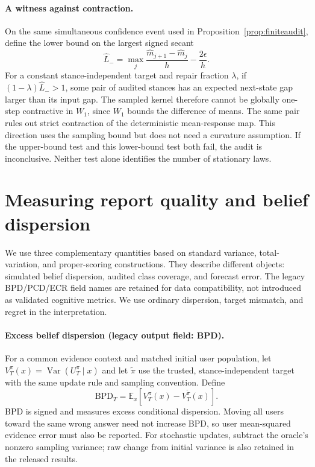 \documentclass[10pt]{article}
\newcommand{\E}{\mathbb E}
\newcommand{\Var}{\operatorname{Var}}
\begin{document}
\paragraph{A witness against contraction.}
On the same simultaneous confidence event used in
Proposition~\ref{prop:finiteaudit}, define the lower bound on the largest
signed secant
\[
 \widehat L_-=\max_j\frac{\widehat m_{j+1}-\widehat m_j}{h}
             -\frac{2\epsilon}{h}.
\]
For a constant stance-independent target and repair fraction $\lambda$,
if $(1-\lambda)\widehat L_->1$, some pair of audited stances has an
expected next-state gap larger than its input gap. The sampled kernel
therefore cannot be globally one-step contractive in $W_1$, since $W_1$
bounds the difference of means. The same pair rules out strict
contraction of the deterministic mean-response map. This direction uses
the sampling bound but does not need a curvature assumption. If the
upper-bound test and this lower-bound test both fail, the audit is
inconclusive. Neither test alone identifies the number of stationary laws.

\section{Measuring report quality and belief dispersion}
We use three complementary quantities based on standard variance,
total-variation, and proper-scoring constructions. They describe different
objects: simulated belief dispersion, audited class coverage, and forecast
error. The legacy BPD/PCD/ECR field names are retained for data compatibility, not introduced as validated cognitive metrics. We use ordinary dispersion, target mismatch, and regret in the interpretation.

\paragraph{Excess belief dispersion (legacy output field: BPD).}
For a common evidence context and matched initial user population, let
$V_T^\pi(x)=\Var(U_T^\pi\mid x)$ and let $\widetilde\pi$ use the trusted,
stance-independent target with the same update rule and sampling convention.
Define
\begin{equation}
 \mathrm{BPD}_T=\E_x[V_T^\pi(x)-V_T^{\widetilde\pi}(x)].
 \label{eq:bpd}
\end{equation}
BPD is signed and measures excess conditional dispersion. Moving all users toward
the same wrong answer need not increase BPD, so user mean-squared evidence
error must also be reported. For stochastic updates, subtract the oracle's
nonzero sampling variance; raw change from initial variance is also retained
in the released results.
\end{document}
